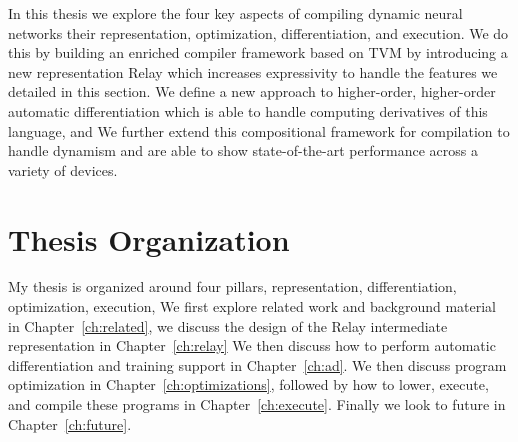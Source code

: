 In this thesis we explore the four key aspects of compiling dynamic
  neural networks their representation, optimization, differentiation,
  and execution.
We do this by building an enriched compiler framework based on TVM by introducing
  a new representation Relay which increases expressivity to handle the features
  we detailed in this section.
We define a new approach to higher-order, higher-order automatic differentiation
  which is able to handle computing derivatives of this language, and
We further extend this compositional framework for compilation to handle dynamism
  and are able to show state-of-the-art performance across a variety of devices.

\section{Thesis Organization}

My thesis is organized around four pillars, representation, differentiation, optimization, execution,
We first explore related work and background material in Chapter~\ref{ch:related},
  we discuss the design of the Relay intermediate representation in Chapter~\ref{ch:relay}
We then discuss how to perform automatic differentiation and training support in Chapter~\ref{ch:ad}.
We then discuss program optimization in Chapter~\ref{ch:optimizations},
  followed by how to lower, execute, and compile these programs in
  Chapter~\ref{ch:execute}.
Finally we look to future in Chapter~\ref{ch:future}.







